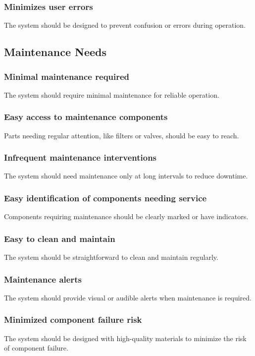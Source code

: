 \documentclass[11pt]{article}
\begin{document}
\subsubsection{Minimizes user errors}
The system should be designed to prevent confusion or errors during operation.

\newpage
\subsection{Maintenance Needs}

\subsubsection{Minimal maintenance required}
The system should require minimal maintenance for reliable operation.

\subsubsection{Easy access to maintenance components}
Parts needing regular attention, like filters or valves, should be easy to reach.

\subsubsection{Infrequent maintenance interventions}
The system should need maintenance only at long intervals to reduce downtime.

\subsubsection{Easy identification of components needing service}
Components requiring maintenance should be clearly marked or have indicators.

\subsubsection{Easy to clean and maintain}
The system should be straightforward to clean and maintain regularly.

\subsubsection{Maintenance alerts}
The system should provide visual or audible alerts when maintenance is required.

\subsubsection{Minimized component failure risk}
The system should be designed with high-quality materials to minimize the risk of component failure.
\end{document}
